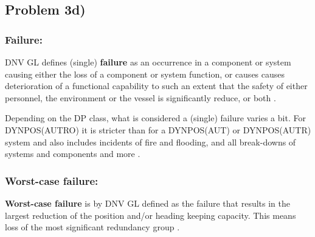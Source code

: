 
\subsection{Problem 3d)} \label{Sec:3d}

\subsubsection{Failure:} 
DNV GL defines (single) \textbf{failure} as an occurrence in a component or system causing either the loss of a component or system function, or causes causes deterioration of a functional capability to such an extent that the safety of either personnel, the environment or the vessel is significantly reduce, or both \cite{RulesShipsDNVGLPart6Chap3}.

Depending on the DP class, what is considered a (single) failure varies a bit. For DYNPOS(AUTRO) it is stricter than for a DYNPOS(AUT) or DYNPOS(AUTR) system and also includes incidents of fire and flooding, and all break-downs of systems and components and more \cite{RulesShipsDNVGLPart6Chap3}.

\subsubsection{Worst-case failure:} 
\textbf{Worst-case failure} is by DNV GL defined as the failure that results in the largest reduction of the position and/or heading keeping capacity. This means loss of the most significant redundancy group \cite{RulesShipsDNVGLPart6Chap3}.


